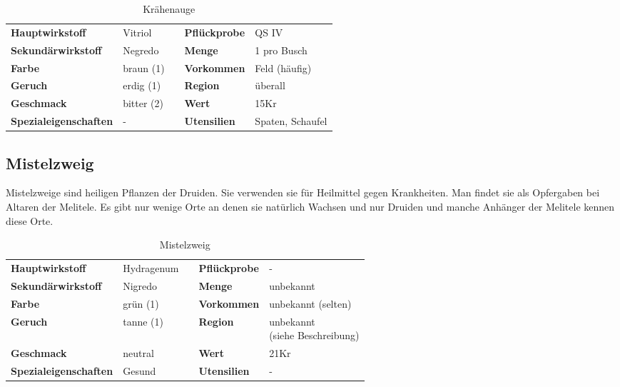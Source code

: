 \begin{table}[H] 
\begin{center} 
\begin{tabular}{|l|l|p{1cm}|l|l|} 
  	\cline{1-2} \cline{4-5} 
  	\textbf{Hauptwirkstoff} & Vitriol && \textbf{Pflückprobe} & QS IV \\ \cline{1-2} \cline{4-5} 
  	\textbf{Sekundärwirkstoff} & Negredo && \textbf{Menge} & 1 pro Busch \\ \cline{1-2} \cline{4-5} 
  	\textbf{Farbe} & braun (1) && \textbf{Vorkommen} & Feld (häufig) \\ \cline{1-2} \cline{4-5} 
  	\textbf{Geruch} & erdig (1) && \textbf{Region} & überall \\ \cline{1-2} \cline{4-5} 
  	\textbf{Geschmack} & bitter (2) && \textbf{Wert} & 15Kr \\ \cline{1-2} \cline{4-5} 
  	\textbf{Spezialeigenschaften} & - && \textbf{Utensilien} & Spaten, Schaufel \\ \cline{1-2} \cline{4-5} 
\end{tabular} 
\end{center} 
\caption{Krähenauge} 
\label{tab:kraehenauge} 
\end{table}

\subsection{Mistelzweig}
Mistelzweige sind heiligen Pflanzen der Druiden. Sie verwenden sie für Heilmittel gegen Krankheiten. Man findet sie als Opfergaben bei Altaren der Melitele. Es gibt nur wenige Orte an denen sie natürlich Wachsen und nur Druiden und manche Anhänger der Melitele kennen diese Orte.

\begin{table}[H] 
\begin{center} 
\begin{tabular}{|l|l|p{1cm}|l|l|} 
  	\cline{1-2} \cline{4-5} 
  	\textbf{Hauptwirkstoff} & Hydragenum && \textbf{Pflückprobe} & - \\ \cline{1-2} \cline{4-5} 
  	\textbf{Sekundärwirkstoff} & Nigredo && \textbf{Menge} & unbekannt \\ \cline{1-2} \cline{4-5} 
  	\textbf{Farbe} & grün (1) && \textbf{Vorkommen} & unbekannt (selten) \\ \cline{1-2} \cline{4-5} 
  	\textbf{Geruch} & tanne (1) && \textbf{Region} & \brcell{unbekannt \\ (siehe Beschreibung)} \\ \cline{1-2} \cline{4-5} 
  	\textbf{Geschmack} & neutral && \textbf{Wert} & 21Kr \\ \cline{1-2} \cline{4-5} 
  	\textbf{Spezialeigenschaften} & Gesund && \textbf{Utensilien} & - \\ \cline{1-2} \cline{4-5} 
\end{tabular} 
\end{center} 
\caption{Mistelzweig} 
\label{tab:mistelzweig} 
\end{table}

